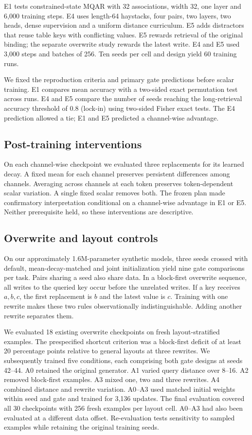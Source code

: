 \documentclass[conference]{IEEEtran}
\begin{document}
E1 tests constrained-state MQAR with 32 associations, width 32, one layer and 6,000 training steps. E4 uses length-64 haystacks, four pairs, two layers, two heads, dense supervision and a uniform distance curriculum. E5 adds distractors that reuse table keys with conflicting values. E5 rewards retrieval of the original binding; the separate overwrite study rewards the latest write. E4 and E5 used 3,000 steps and batches of 256. Ten seeds per cell and design yield 60 training runs.

We fixed the reproduction criteria and primary gate predictions before scalar training. E1 compares mean accuracy with a two-sided exact permutation test across runs. E4 and E5 compare the number of seeds reaching the long-retrieval accuracy threshold of 0.8 (lock-in) using two-sided Fisher exact tests. The E4 prediction allowed a tie; E1 and E5 predicted a channel-wise advantage.
\subsection{Post-training interventions}
On each channel-wise checkpoint we evaluated three replacements for its learned decay. A fixed mean for each channel preserves persistent differences among channels. Averaging across channels at each token preserves token-dependent scalar variation. A single fixed scalar removes both. The frozen plan made confirmatory interpretation conditional on a channel-wise advantage in E1 or E5. Neither prerequisite held, so these interventions are descriptive.
\subsection{Overwrite and layout controls}
On our approximately 1.6M-parameter synthetic models, three seeds crossed with default, mean-decay-matched and joint initialization yield nine gate comparisons per task. Pairs sharing a seed also share data. In a block-first overwrite sequence, all writes to the queried key occur before the unrelated writes. If a key receives $a,b,c$, the first replacement is $b$ and the latest value is $c$. Training with one rewrite makes these two rules observationally indistinguishable. Adding another rewrite separates them.

We evaluated 18 existing overwrite checkpoints on fresh layout-stratified examples. The prespecified shortcut criterion was a block-first deficit of at least 20 percentage points relative to general layouts at three rewrites. We subsequently trained five conditions, each comprising both gate designs at seeds 42--44. A0 retained the original generator. A1 varied query distance over 8--16. A2 removed block-first examples. A3 mixed one, two and three rewrites. A4 combined distance and rewrite variation. A0--A3 used matched initial weights within seed and gate and trained for 3,136 updates. The final evaluation covered all 30 checkpoints with 256 fresh examples per layout cell. A0--A3 had also been evaluated at a different data offset. Re-evaluation tests sensitivity to sampled examples while retaining the original training seeds.
\end{document}
